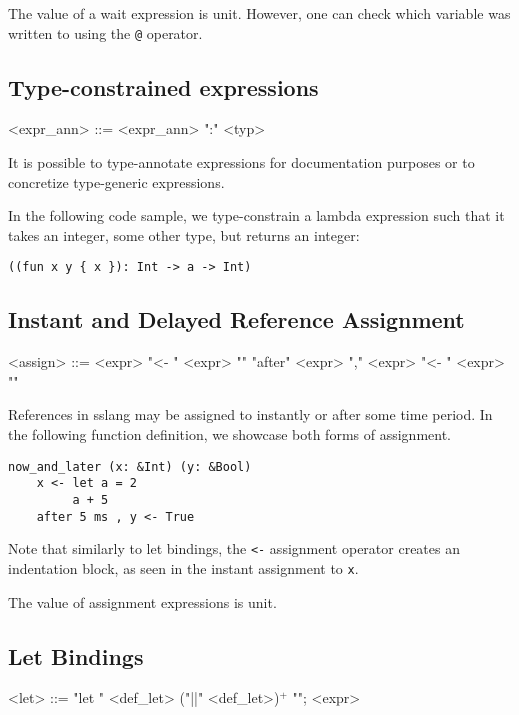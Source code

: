 \documentclass{article}
\begin{document}
The value of a wait expression is unit. However, one can check which variable was written to using the \texttt{@} operator.
\subsection{Type-constrained expressions}
\begin{grammar}
<expr_ann> ::= <expr_ann> ":" <typ>
\end{grammar}

It is possible to type-annotate expressions for documentation purposes or to concretize type-generic expressions.

In the following code sample, we type-constrain a lambda expression such that it takes an integer, some other type, but returns an integer:
\begin{lstlisting}
((fun x y { x }): Int -> a -> Int)
\end{lstlisting}

\subsection{Instant and Delayed Reference Assignment}
\begin{grammar}
<assign> ::= <expr> "<- {" <expr> "}"
\alt "after" <expr> "," <expr> "<- {" <expr> "}"
\end{grammar}
References in sslang may be assigned to instantly or after some time period. In the following function definition, we showcase both forms of assignment.
\begin{lstlisting}
now_and_later (x: &Int) (y: &Bool)
    x <- let a = 2
         a + 5
    after 5 ms , y <- True
\end{lstlisting}
Note that similarly to let bindings, the \texttt{<-} assignment operator creates an indentation block, as seen in the instant assignment to \texttt{x}.

The value of assignment expressions is unit.
\subsection{Let Bindings}
\begin{grammar}
<let> ::= "let {" <def_let> ("||" <def_let>)$^{+}$ "}"; <expr>
\end{grammar}
\end{document}
